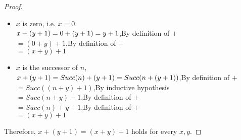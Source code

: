 \documentclass[11pt,a4paper]{article}
\begin{document}

\begin{proof}
    \begin{itemize}
        \item $x$ is zero, i.e. $x = 0$. \\
        $x + (y + 1)\\
        = 0 + (y + 1)\\
        = y + 1$,By definition of $+$\\
        $= (0 + y) + 1$,By definition of $+$\\
        $= (x + y) + 1$
        \item $x$ is the successor of $n$,\\
        $x + (y + 1)\\
        = Succ(n) + (y + 1)\\
        = Succ(n + (y + 1))$,By definition of $+$\\
        $= Succ((n + y) + 1)$,By inductive hypothesis\\
        $= Succ(n + y) + 1$,By definition of $+$\\
        $= Succ(n) + y + 1$,By definition of $+$\\
        $= (x + y) + 1$
      \end{itemize}
      Therefore, $x + (y + 1) = (x + y) + 1$ holds for every $x, y$.
\end{proof}

\end{document}
